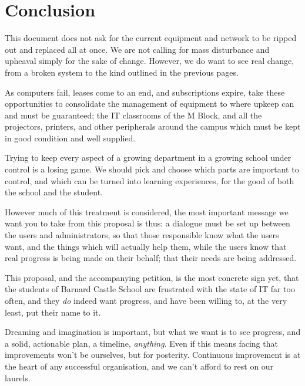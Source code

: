 \documentclass[a4paper,leqno,titlepage]{article}
\begin{document}
\break








\section{Conclusion}

This document does not ask for the current equipment and network to be ripped
out and replaced all at once. We are not calling for mass disturbance and
upheaval simply for the sake of change.
However, we do want to see real change, from a
broken system to the kind outlined in the previous pages.


As computers fail, leases come to an end, and subscriptions expire,
take these opportunities to consolidate the management of equipment to where
upkeep can and must be guaranteed; the IT classrooms of the M Block,
and all the projectors, printers, and other peripherals
around the campus which must be kept in good condition and well supplied.


Trying to keep every aspect of a growing department in a growing school
under control is a losing game. We should pick and choose which parts
are important to control, and which can be turned into learning experiences,
for the good of both the school and the student.


However much of this treatment is considered, the most important message we
want you to take from this proposal is thus: a dialogue must be set up between
the users and administrators, so that those responsible know what the users want,
and the things which will actually help them, while the users know that real
progress is being made on their behalf; that their needs are being addressed.


This proposal, and the accompanying petition, is the most
concrete sign yet, that the students of Barnard Castle School are
frustrated with the state of IT far too often, and they \emph{do} indeed want
progress, and have been willing to, at the very least, put their name to it.


Dreaming and imagination is important, but what we want is to see progress,
and a solid, actionable plan, a timeline, \emph{anything}. Even if this means
facing that improvements won't be ourselves, but for posterity.
Continuous improvement is at the heart of any successful organisation,
and we can't afford to rest on our laurels.
\end{document}
